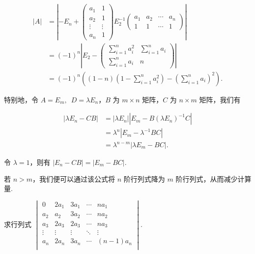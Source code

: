 \begin{enumerate}
\begin{solution}
            \begin{align*}
                |A| & = \left\vert-E_n +
                \begin{pmatrix}
                    a_1 & 1 \\ a_2 & 1 \\ \vdots & \vdots \\ a_n & 1
                \end{pmatrix} E_2^{-1}
                \begin{pmatrix}
                    a_1 & a_2 & \cdots & a_n \\ 1 & 1 & \cdots & 1
                \end{pmatrix}\right\vert                                                                       \\
                    & = (-1)^n \left|E_2 -
                \begin{pmatrix}
                    \sum\limits_{i=1}^n a_i^2 & \sum\limits_{i=1}^n a_i \\[2ex]
                    \sum\limits_{i=1}^n a_i   & n
                \end{pmatrix}\right|                                                          \\
                    & = (-1)^n \left((1-n)\left(1-\sum\limits_{i=1}^n a_i^2\right) - \left(\sum\limits_{i=1}^n a_i\right)^2\right).
            \end{align*}
        \end{solution}

        特别地，令 $A = E_m, \enspace D = \lambda E_n$，$B$ 为 $m \times n$ 矩阵，$C$ 为 $n \times m$ 矩阵，我们有

        \begin{align*}
            |\lambda E_n - CB| &= |\lambda E_n| |E_m - B (\lambda E_n)^{-1} C| \\
                               &= \lambda^n |E_m - \lambda^{-1} BC| \\
                               &= \lambda^{n-m} |\lambda E_m - BC|.
        \end{align*}

        令 $\lambda = 1$，则有 $|E_n - CB| = |E_m - BC|$.

        若 $n > m$，我们便可以通过该公式将 $n$ 阶行列式降为 $m$ 阶行列式，从而减少计算量.

        \begin{example}{}{}
            求行列式 $\begin{vmatrix}
                    0      & 2a_1   & 3a_1   & \cdots & na_1     \\
                    a_2    & a_2    & 3a_2   & \cdots & na_2     \\
                    a_3    & 2a_3   & 2a_3   & \cdots & na_3     \\
                    \vdots & \vdots & \vdots & \ddots & \vdots   \\
                    a_n    & 2a_n   & 3a_n   & \cdots & (n-1)a_n \\
                \end{vmatrix}$.
        \end{example}


\end{enumerate}
